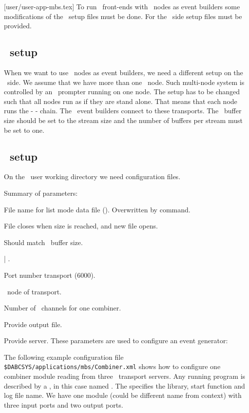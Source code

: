 [user/user-app-mbs.tex]
To run \mbs\ front-ends with \dabc\ nodes as event builders some
modifications of the \mbs\ setup files must be done.
For the \dabc\ side setup files must be provided.
\subsection[MBS setup]{\mbs\ setup}
When we want to use \dabc\ nodes as event builders, we need a different
setup on the \mbs\ side. We assume that we have more than one
\mbs\ node. Such multi-node system is controlled by an \mbs\ prompter running on one node.
The setup has to be changed such that all nodes run as if they are stand alone.
That means that each node runs the  -  - 
chain. The \dabc\ event builders connect to these transports.
The \mbs\ buffer size should be set to the stream size and the number of buffers per
stream must be set to one.

\subsection[DABC setup]{\dabc\ setup}
On the \dabc\ user working directory we need configuration files.

Summary of parameters:
\bdes
\item[MbsFileName] File name for list mode data file (). Overwritten by command.
\item[MbsFileSizeLimit] File closes when size is reached, and new file opens.
\item[BufferSize] Should match \mbs\ buffer size.
\item[MbsServerKind]  | .
\item[MbsServerPort] Port number transport (6000).
\item[MbsServerName] \mbs\ node of transport.
\item[NumInputs] Number of \mbs\ channels for one combiner.
\item[DoFile] Provide output file.
\item[DoServer] Provide server.
\edes
These parameters are used to configure an event generator:
\bdes
\item[NumSubevents]
\item[FirstProcId]
\item[SubeventSize]
\item[Go4Random]
\edes
{}
The following example configuration file {\tt \$DABCSYS/applications/mbs/Combiner.xml} shows how to 
configure one combiner module reading from three \mbs\ transport servers.
Any running program is described by a , in this case
named . The  specifies the
library, start function and log file name.
We have one module  (could be different name from context) 
with three input ports and two output ports.

